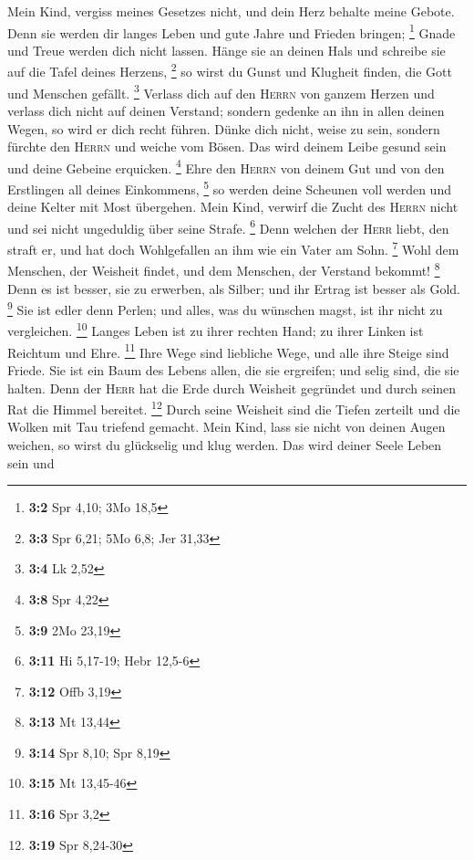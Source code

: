  Mein Kind, vergiss meines Gesetzes nicht, und dein Herz
behalte meine Gebote.  Denn sie werden dir langes Leben
und gute Jahre und Frieden bringen; \footnote{\textbf{3:2} Spr 4,10; 3Mo
  18,5}  Gnade und Treue werden dich nicht lassen. Hänge
sie an deinen Hals und schreibe sie auf die Tafel deines Herzens,
\footnote{\textbf{3:3} Spr 6,21; 5Mo 6,8; Jer 31,33}  so
wirst du Gunst und Klugheit finden, die Gott und Menschen gefällt.
\footnote{\textbf{3:4} Lk 2,52}  Verlass dich auf den
\textsc{Herrn} von ganzem Herzen und verlass dich nicht auf deinen
Verstand;  sondern gedenke an ihn in allen deinen Wegen,
so wird er dich recht führen.  Dünke dich nicht, weise zu
sein, sondern fürchte den \textsc{Herrn} und weiche vom Bösen.
 Das wird deinem Leibe gesund sein und deine Gebeine
erquicken. \footnote{\textbf{3:8} Spr 4,22}  Ehre den
\textsc{Herrn} von deinem Gut und von den Erstlingen all deines
Einkommens, \footnote{\textbf{3:9} 2Mo 23,19}  so werden
deine Scheunen voll werden und deine Kelter mit Most übergehen.
 Mein Kind, verwirf die Zucht des \textsc{Herrn} nicht
und sei nicht ungeduldig über seine Strafe. \footnote{\textbf{3:11} Hi
  5,17-19; Hebr 12,5-6}  Denn welchen der \textsc{Herr}
liebt, den straft er, und hat doch Wohlgefallen an ihm wie ein Vater am
Sohn. \footnote{\textbf{3:12} Offb 3,19}  Wohl dem
Menschen, der Weisheit findet, und dem Menschen, der Verstand bekommt!
\footnote{\textbf{3:13} Mt 13,44}  Denn es ist besser,
sie zu erwerben, als Silber; und ihr Ertrag ist besser als Gold.
\footnote{\textbf{3:14} Spr 8,10; Spr 8,19}  Sie ist
edler denn Perlen; und alles, was du wünschen magst, ist ihr nicht zu
vergleichen. \footnote{\textbf{3:15} Mt 13,45-46}  Langes
Leben ist zu ihrer rechten Hand; zu ihrer Linken ist Reichtum und Ehre.
\footnote{\textbf{3:16} Spr 3,2}  Ihre Wege sind
liebliche Wege, und alle ihre Steige sind Friede.  Sie
ist ein Baum des Lebens allen, die sie ergreifen; und selig sind, die
sie halten.  Denn der \textsc{Herr} hat die Erde durch
Weisheit gegründet und durch seinen Rat die Himmel bereitet. \footnote{\textbf{3:19}
  Spr 8,24-30}  Durch seine Weisheit sind die Tiefen
zerteilt und die Wolken mit Tau triefend gemacht.  Mein
Kind, lass sie nicht von deinen Augen weichen, so wirst du glückselig
und klug werden.  Das wird deiner Seele Leben sein und
